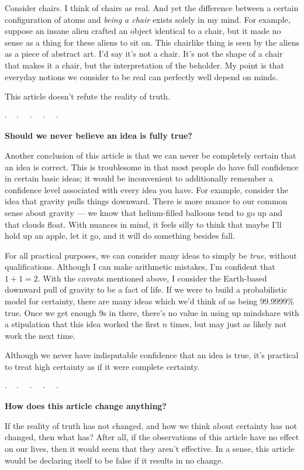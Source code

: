 \documentclass[11pt, oneside]{article}
\newcommand{\dotq}{\cdot\quad}
\newcommand{\scenebreak}{
    \medskip\centerline{$\dotq\dotq\dotq\dotq\cdot$}\medskip
}
\begin{document}
Consider chairs. I think of chairs as real. And yet the difference between a
certain configuration of atoms and {\em being a chair} exists solely in my mind.
For example, suppose an insane alien crafted an object identical to a chair,
but it made no sense as a thing for these aliens to sit on.
This chairlike thing
is seen by the aliens as a piece of abstract art.
I'd say it's not a chair.
It's not the shape of a
chair that makes it a chair, but the interpretation of the beholder.
My point is that everyday notions we consider to be real can perfectly well
depend on minds.

This article doesn't refute the reality of truth.

\scenebreak

\noindent
{\bf Should we never believe an idea is fully true?}

Another conclusion of this article is that we can never be completely certain
that an idea is correct.
This is troublesome in that most people do have full confidence in certain
basic
ideas; it would be inconvenient to additionally remember a confidence level
associated with every idea you have.
For example, consider the idea that gravity pulls things downward.
There is more nuance to our common sense about gravity --- we know that
helium-filled balloons tend to go up and that clouds float.
With nuances in mind, it feels silly to think that maybe I'll hold up an
apple, let it go, and it will do something besides fall.

For all practical purposes, we can consider many ideas to simply be {\em true},
without qualifications. Although I can make arithmetic mistakes, I'm confident
that $1+1=2$. With the caveats mentioned above, I consider the Earth-based
downward pull of gravity to be a fact of life. If we were to build a
probabilistic model for certainty, there are many ideas which we'd think of as
being 99.9999\% true. Once we get enough 9s in there,
there's no value in using up mindshare with a stipulation that this idea worked
the first $n$ times, but may just as likely not work the next time.

Although we never have indisputable confidence that an idea is true,
it's practical to treat high certainty as if it were complete certainty.

\scenebreak

\noindent
{\bf How does this article change anything?}

If the reality of truth has not changed, and how we think about certainty has
not changed, then what has? After all, if the observations of this
article have no effect on our lives, then it would seem that they aren't
effective. In a sense, this article would be declaring itself to be false if
it results in no change.
\end{document}
